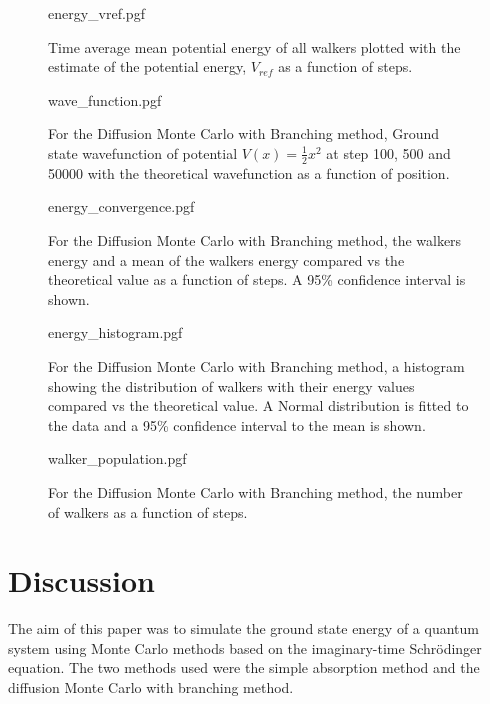 \documentclass[reqno]{amsart}
\numberwithin{equation}{section}
\numberwithin{figure}{section}
\begin{document}
\begin{figure}[h]
    \centering
    {energy_vref.pgf}
    \caption{Time average mean potential energy of all walkers plotted with the estimate of the potential energy, $V_{ref}$ as a function of steps.}
    \label{fig:energy_vref}
\end{figure}

\begin{figure}[h]
    \centering
    {wave_function.pgf}
    \caption{For the Diffusion Monte Carlo with Branching method, Ground state wavefunction of potential $V(x) = \frac{1}{2}x^2$ at step 100, 500 and 50000 with the theoretical wavefunction as a function of position.}
    \label{fig:wave_function}
\end{figure}

\begin{figure}[h]
    \centering
    {energy_convergence.pgf}
    \caption{For the Diffusion Monte Carlo with Branching method, the walkers energy and a mean of the walkers energy compared vs the theoretical value as a function of steps. A 95\% confidence interval is shown.}
    \label{fig:energy_convergence}
\end{figure}

\begin{figure}[h]
    \centering
    {energy_histogram.pgf}
    \caption{For the Diffusion Monte Carlo with Branching method, a histogram showing the distribution of walkers with their energy values compared vs the theoretical value. A Normal distribution is fitted to the data and a 95\% confidence interval to the mean is shown.}
    \label{fig:energy_histogram}
\end{figure}

\begin{figure}[h]
    \centering
    {walker_population.pgf}
    \caption{For the Diffusion Monte Carlo with Branching method, the number of walkers as a function of steps.}
    \label{fig:walker_population}
\end{figure}

\section{Discussion}

The aim of this paper was to simulate the ground state energy of a quantum system using Monte Carlo methods based on the imaginary-time Schrödinger equation. The two methods used were the simple absorption method and the diffusion Monte Carlo with branching method. \\
\end{document}
